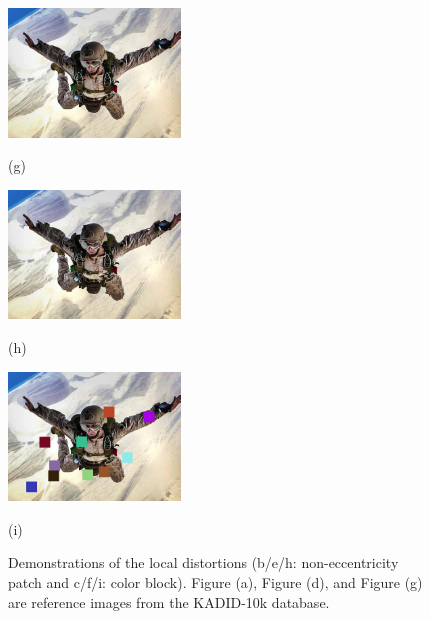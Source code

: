 \begin{figure}[!]
		\begin{minipage}[t]{.32\linewidth}
			\includegraphics[width=1.8in]{KADID/I72.jpg}
			\centerline{(g)}
		\end{minipage}
		\begin{minipage}[t]{.32\linewidth}
			\includegraphics[width=1.8in]{KADID/I72_20_04.jpg}
			\centerline{(h)}
		\end{minipage}
		\begin{minipage}[t]{.32\linewidth}
			\includegraphics[width=1.8in]{KADID/I72_23_05.jpg}
			\centerline{(i)}
		\end{minipage}
		
		\caption{Demonstrations of the local distortions (b/e/h: non-eccentricity patch and c/f/i: color block). Figure (a), Figure (d), and Figure (g) are reference images from the KADID-10k database.}
		\label{KADID-Distortion}
	\end{figure}

